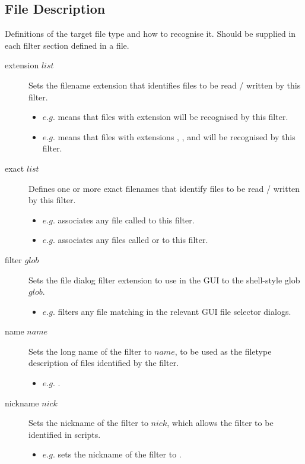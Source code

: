 \subsection{File Description}
Definitions of the target file type and how to recognise it. Should be supplied in each filter section defined in a file.\\
\begin{description}

	\item[extension $list$\its]
	Sets the filename extension that identifies files to be read / written by this filter.
	\begin{itemize}
		\item $e.g.$  means that files with extension  will be recognised by this filter.
		\item $e.g.$  means that files with extensions , , and  will be recognised by this filter.
	\end{itemize}

	\item[exact $list$\its]
	Defines one or more exact filenames that identify files to be read / written by this filter.
	\begin{itemize}
		\item $e.g.$  associates any file called  to this filter.
		\item $e.g.$  associates any files called  or  to this filter.
	\end{itemize}

	\item[filter $glob$\its]
	Sets the file dialog filter extension to use in the GUI to the shell-style glob $glob$.
	\begin{itemize}
		\item $e.g.$  filters any file matching  in the relevant GUI file selector dialogs.
	\end{itemize}

	\item[name $name$\its]
	Sets the long name of the filter to $name$, to be used as the filetype description of files identified by the filter.
	\begin{itemize}
		\item $e.g.$ .
	\end{itemize}

	\item[nickname $nick$\its]
	Sets the nickname of the filter to $nick$, which allows the filter to be identified in scripts.
	\begin{itemize}
		\item $e.g.$  sets the nickname of the filter to .
	\end{itemize}

\end{description}


